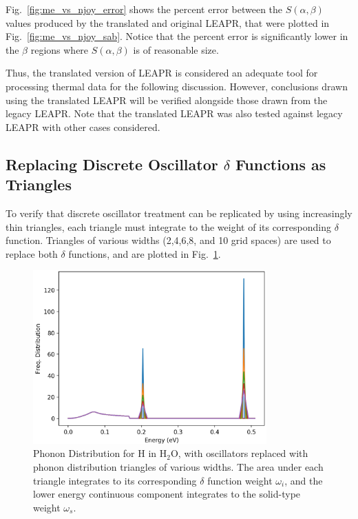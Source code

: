 \documentclass[Master.tex]{subfiles}
\begin{document}
    Fig.~\ref{fig:me_vs_njoy_error} shows the percent error between the $S(\alpha,\beta)$ values produced by the translated and original LEAPR, that were plotted in Fig.~\ref{fig:me_vs_njoy_sab}.  Notice that the percent error is significantly lower in the $\beta$ regions where $S(\alpha,\beta)$ is of reasonable size. 

    Thus, the translated version of LEAPR is considered an adequate tool for processing thermal data for the following discussion. However, conclusions drawn using the translated LEAPR will be verified alongside those drawn from the legacy LEAPR. Note that the translated LEAPR was also tested against legacy LEAPR with other cases considered.


  \subsection{Replacing Discrete Oscillator $\delta$ Functions as Triangles}
    To verify that discrete oscillator treatment can be replicated by using increasingly thin triangles, each triangle must integrate to the weight of its corresponding $\delta$ function. Triangles of various widths (2,4,6,8, and 10 grid spaces) are used to replace both $\delta$ functions, and are plotted in Fig.~\ref{fig:waterPhononTriangle}.
    \begin{figure}[h]
      \begin{center}
        \includegraphics[width=0.8\textwidth]{waterPhononDistTrianglesb}
        \caption[Triangles of various widths approximatin $\delta$ functions for H in H$_2$O]{Phonon Distribution for H in H$_2$O, with oscillators replaced with phonon distribution triangles of various widths. The area under each triangle integrates to its corresponding $\delta$ function weight $\omega_i$, and the lower energy continuous component integrates to the solid-type weight $\omega_s$.}
        \label{fig:waterPhononTriangle}
      \end{center}
    \end{figure}
\end{document}
